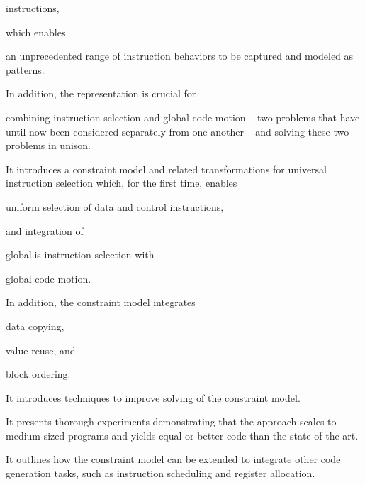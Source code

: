 \begin{contributions}
\begin{contributions}
        \glspl{instruction},
    \end{contributions}
    which enables
    \begin{contributions}[resume]
      \item {}
        an unprecedented range of instruction behaviors to be captured and
        modeled as \glspl{pattern}.
    \end{contributions}
    In addition, the representation is crucial for
    \begin{contributions}[resume]
      \item {}
        combining \gls{instruction selection} and \gls{global code motion} --
        two problems that have until now been considered separately from one
        another -- and solving these two problems in unison.
    \end{contributions}
  \item {}
    It introduces a \gls{constraint model} and related transformations for
    \gls{universal instruction selection} which, for the first time, enables
    \begin{contributions}
      \item {}
        uniform selection of data and control \glspl{instruction},
    \end{contributions}
    and integration of
    \begin{contributions}[resume]
      \item {}
        \gls{global.is} \gls{instruction selection} with
      \item {}
        \gls{global code motion}.
    \end{contributions}
    In addition, the \gls{constraint model} integrates
    \begin{contributions}[resume]
      \item {}
        \gls{data copying},
      \item {}
        \gls{value reuse}, and
      \item {}
        \gls{block ordering}.
    \end{contributions}
  \item {}
    It introduces techniques to improve solving of the \gls{constraint model}.
  \item {}
    It presents thorough experiments demonstrating that the approach scales to
    medium-sized \glspl{program} and yields equal or better code than the state
    of the art.
  \item {}
    It outlines how the \gls{constraint model} can be extended to integrate
    other \gls{code generation} tasks, such as \gls{instruction scheduling} and
    \gls{register allocation}.
\end{contributions}

